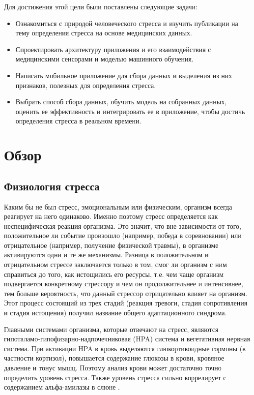 \documentclass[14pt]{matmex-diploma-custom}
\begin{document}
Для достижения этой цели были поставлены следующие задачи:

\begin{itemize}
\item Ознакомиться с природой человеческого стресса и изучить публикации на тему
  определения стресса на основе медицинских данных.
\item Спроектировать архитектуру приложения и его взаимодействия с медицинскими
  сенсорами и моделью машинного обучения.
\item Написать мобильное приложение для сбора данных и выделения из них
  признаков, полезных для определения стресса.
\item Выбрать способ сбора данных, обучить модель на собранных данных,
  оценить ее эффективность и интегрировать ее в приложение, чтобы достичь
  определения стресса в реальном времени.
\end{itemize}

\section{Обзор}
\subsection{Физиология стресса}
Каким бы не был стресс, эмоциональным или физическим, организм всегда реагирует
на него одинаково. Именно поэтому стресс определяется как неспецифическая
реакция организма. Это значит, что вне зависимости от того, положительное ли
событие произошло (например, победа в соревновании) или отрицательное (например,
получение физической травмы), в организме активируются одни и те же механизмы.
Разница в положительном и отрицательном стрессе заключается только в том, смог
ли организм с ним справиться до того, как истощились его ресурсы, т.е. чем чаще
организм подвергается конкретному стрессору и чем он продолжительнее и
интенсивнее, тем больше вероятность, что данный стрессор отрицательно влияет на
организм. Этот процесс состоящий из трех стадий (реакция тревоги, стадия
сопротивления и стадия истощения) получил название общего адаптационного
синдрома.

Главными системами организма, которые отвечают на стресс, являются
гипоталамо-гипофизарно-надпочечниковая (HPA) система и вегетативная нервная
система. При активации HPA в кровь выделяются глюкортикоидные гормоны (в
частности кортизол), повышается содержание глюкозы в крови, кровяное давление и
тонус мышц. Поэтому анализ крови может достаточно точно определить уровень
стресса. Также уровень стресса сильно коррелирует с содержанием альфа-амилазы в
слюне \cite{article:alpha_amylase}.
\end{document}
